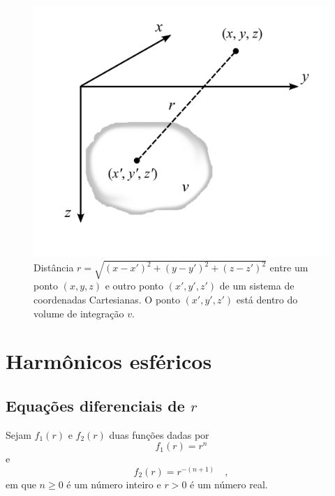 \documentclass[10pt,a4paper,fleqn]{article}
\begin{document}
\begin{figure}[h]
    \centering
    \includegraphics[scale=1]{Figs/Fig1.png}
    \caption{Dist\^{a}ncia $r = \sqrt{(x-x')^{2}+(y-y')^{2}+(z-z')^{2}}$ entre
        um ponto $(x,y,z)$ e outro ponto $(x',y',z')$ de um sistema de coordenadas Cartesianas. O ponto
        $(x',y',z')$ est\'{a} dentro do volume de integraç\~{a}o $v$.}   
    \label{fig:fig1}
\end{figure}

\clearpage

\section{Harm\^{o}nicos esf\'{e}ricos}

\subsection{Equaç\~{o}es diferenciais de $r$}

Sejam $f_{1}(r)$ e $f_{2}(r)$ duas funç\~{o}es dadas por
\begin{equation}
f_{1}(r) = r^{n}
\label{eq:ex211-r^}
\end{equation}
e
\begin{equation}
f_{2}(r) = r^{-(n+1)} \quad ,
\label{eq:ex211-r_}
\end{equation}
em que $n \geqslant 0$ \'{e} um n\'{u}mero inteiro e $r > 0$ \'{e} um n\'{u}mero real. 
\end{document}
